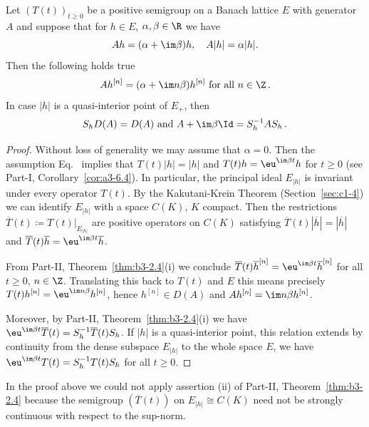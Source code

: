 \begin{theorem}\label{thm:c3-2.2}
	Let $(T(t))_{t\geq 0}$ be a positive semigroup on a Banach lattice $E$ with generator $A$ and suppose that for $h \in E$, $\alpha,\beta \in \R $ we have
	\begin{equation}\label{eq:c3-2.6}
		Ah = (\alpha+\im\beta )h, \quad A|h| = \alpha|h|.
	\end{equation}
Then the following holds true
\begin{equation}\label{eq:c3-2.7}
	Ah^{[n]} = (\alpha+\im n\beta)h^{[n]} \text{ for all } n \in \Z\,.
\end{equation}
In case $|h|$ is a quasi-interior point of\/ $E_{+}$, then
\[
S_{h}D(A) = D(A) \text{ and } A + \im\beta \Id = S_{h}^{-1}AS_{h}\,.
\]
\end{theorem}
\begin{proof}
	Without loss of generality we may assume that $\alpha = 0$.
	Then the assumption Eq.~ implies that $T(t)|h| = |h|$ and $T(t)h = \eu^{\im\beta t}h$ for $t \geq 0$ (see Part-I, Corollary~\ref{cor:a3-6.4}).
	In particular, the principal ideal $E_{|h|}$ is invariant under every operator $T(t)$.
	By the Kakutani-Krein Theorem (Section~\ref{sec:c1-4}) we can identify $E_{|h|}$ with a space $C(K)$, $K$ compact.
	Then the restrictions $\overline{T}(t) \coloneq T(t)|_{E_{|h|}}$ are positive operators on $C(K)$ satisfying $\overline{T}(t)|\overline{h}| = |\overline{h}|$ and $\overline{T}(t)\overline{h} = \eu^{\im\beta  t}\overline{h}$.
	
	From Part-II, Theorem~\ref{thm:b3-2.4}(i) we conclude $\overline{T}(t)\overline{h}^{[n]} = \eu^{\im\beta  t}\overline{h}^{[n]}$ for all $t \geq 0$, $n \in \Z$.
	Translating this back to $T(t)$ and $E$ this means precisely $T(t)h^{[n]} = \eu^{\im n\beta}h^{[n]}$, hence $h^{[n]} \in D(A)$ and $Ah^{[n]} = \im  n\beta h^{[n]}$.
	
	Moreover, by Part-II, Theorem~\ref{thm:b3-2.4}(i) we have $\eu^{\im\beta  t}\overline{T}(t) = S_{h}^{-1}\overline{T}(t)S_{h}$.
	If\/ $|h|$ is a quasi-interior point, this relation extends by continuity from the dense subspace $E_{|h|}$ to the whole space $E$, \ie  we have $\eu^{\im\beta  t}T(t) = S_{h}^{-1}T(t)S_{h}$ for all $t \geq 0$.
\end{proof}
In the proof above we could not apply assertion (ii) of Part-II, Theorem~\ref{thm:b3-2.4} because the semigroup $(\overline{T}(t))$ on $E_{|h|} \cong C(K)$ need not be strongly continuous with respect to the sup-norm.

